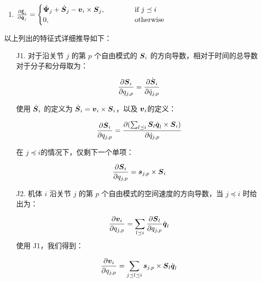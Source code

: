 \documentclass[letterpaper, 10 pt, conference]{ieeetran}  %
\begin{document}
{\begin{enumerate}[label=J{{\arabic*}}.]
     \item $\frac{\partial \boldsymbol{\xi}_{i}}{\partial \dot{\boldsymbol{q}}_{j}}=
    \begin{cases}
    \,\dot{\!\boldsymbol{\Psi}}_{j} + \,\dot{\!\boldsymbol{S}}_{j}-\boldsymbol{v}_{i}  \times \boldsymbol{S}_{j}, &~~~~~~~~~~ \text{if}\ j \preceq i \\
      0, &~~~~~~~~~~ \text{otherwise}
    \end{cases}$
    
\end{enumerate}

 以上列出的特征式详细推导如下：

\begin{enumerate}
 \item [J1.] 对于沿关节 $j$ 的第 $p$ 个自由模式的 $\boldsymbol{S}_{i}$ 的方向导数，相对于时间的总导数对于分子和分母取为：

\begin{equation}
    \frac{\partial \boldsymbol{S}_{i}}{\partial q_{j,p}}=\frac{\partial{\dot{\boldsymbol{S}}}_{i}}{\partial \dot{q}_{j,p}}
\end{equation}

使用 $\,\dot{\!\boldsymbol{S}}_{i}$ 的定义为 $\,\dot{\!\boldsymbol{S}}_{i}=\boldsymbol{v}_{i} \times \boldsymbol{S}_{i}$，以及 $\boldsymbol{v}_{i}$的定义：

\begin{equation}
    \frac{\partial \boldsymbol{S}_{i}}{\partial q_{j,p}}=\frac{\partial (\sum_{l \preceq i} \boldsymbol{S}_{l} \dot{\boldsymbol{q}}_{l} \times \boldsymbol{S}_{i} )}{\partial \dot{q}_{j,p}}
\end{equation}

在 $j \preceq i$的情况下，仅剩下一个单项：

\begin{equation}
    \frac{\partial \Phibar_{i}}{\partial q_{j,p}}= \phibar_{j,p}\times \Phibar_{i} 
    \label{J1_eqn}
\end{equation}   

 \item[J2.] 机体 $i$ 沿关节 $j$ 的第 $p$ 个自由模式的空间速度的方向导数，当 $j \preceq i$ 时给出为：


\begin{equation}
    \frac{\partial \boldsymbol{v}_{i}}{\partial q_{j,p}} = \sum_{l \preceq i} \frac{\partial \boldsymbol{S}_{l}}{\partial q_{j,p}}  \dot{\boldsymbol{q}}_{l}
\end{equation}
使用 J1，我们得到：

\begin{equation}
    \frac{\partial \v_{i}}{\partial q_{j,p}} = \sum_{j \preceq l \preceq i} \phibar_{j,p} \times \Phibar_{l} \qd_{l}
\label{dv_eq2}
\end{equation}


\end{enumerate}}
\end{document}
